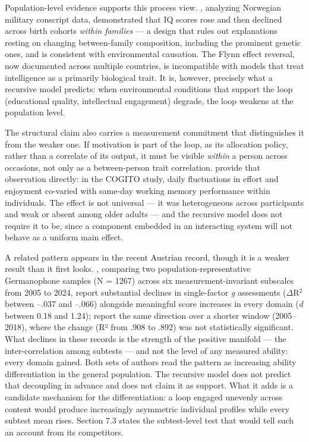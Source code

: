 \documentclass[12pt,a4paper]{article}
\begin{document}
Population-level evidence supports this process view. \citet{BratsbergRogeberg2018}, analyzing Norwegian military conscript data, demonstrated that IQ scores rose and then declined across birth cohorts \emph{within families} ---\hspace{0pt} a design that rules out explanations resting on changing between-family composition, including the prominent genetic ones, and is consistent with environmental causation. The Flynn effect reversal, now documented across multiple countries, is incompatible with models that treat intelligence as a primarily biological trait. It is, however, precisely what a recursive model predicts: when environmental conditions that support the loop (educational quality, intellectual engagement) degrade, the loop weakens at the population level.

The structural claim also carries a measurement commitment that distinguishes it from the weaker one. If motivation is part of the loop, as its allocation policy, rather than a correlate of its output, it must be visible \emph{within} a person across occasions, not only as a between-person trait correlation. \citet{Brose2010} provide that observation directly: in the COGITO study, daily fluctuations in effort and enjoyment co-varied with same-day working memory performance within individuals. The effect is not universal ---\hspace{0pt} it was heterogeneous across participants and weak or absent among older adults ---\hspace{0pt} and the recursive model does not require it to be, since a component embedded in an interacting system will not behave as a uniform main effect.

A related pattern appears in the recent Austrian record, though it is a weaker result than it first looks. \citet{Oberleiter2024}, comparing two population-representative Germanophone samples (N = 1267) across six measurement-invariant subscales from 2005 to 2024, report substantial declines in single-factor \emph{g} assessments ($\Delta$R$^2$ between --.037 and --.066) alongside meaningful score increases in every domain (\emph{d} between 0.18 and 1.24); \citet{Andrzejewski2024} report the same direction over a shorter window (2005--2018), where the change (R² from .908 to .892) was not statistically significant. What declines in these records is the strength of the positive manifold ---\hspace{0pt} the inter-correlation among subtests ---\hspace{0pt} and not the level of any measured ability: every domain gained. Both sets of authors read the pattern as increasing ability differentiation in the general population. The recursive model does not predict that decoupling in advance and does not claim it as support. What it adds is a candidate mechanism for the differentiation: a loop engaged unevenly across content would produce increasingly asymmetric individual profiles while every subtest mean rises. Section 7.3 states the subtest-level test that would tell such an account from its competitors.
\end{document}
